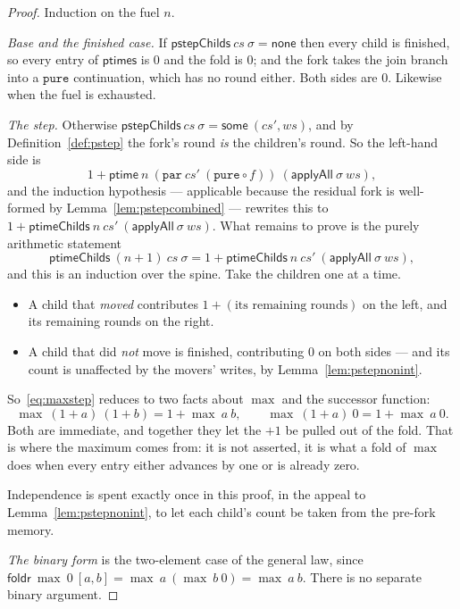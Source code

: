 \documentclass[11pt,a4paper]{article}
\theoremstyle{definition}
\theoremstyle{plain}
\theoremstyle{remark}
\newcommand{\st}{\sigma}
\newcommand{\pstep}{\mathsf{pstep}}
\begin{document}
\begin{proof}
Induction on the fuel $n$.

\emph{Base and the finished case.} If $\pstep\mathsf{Childs}\ cs\ \st = \mathsf{none}$ then
every child is finished, so every entry of $\mathsf{ptimes}$ is $0$ and the fold is $0$; and
the fork takes the join branch into a $\texttt{pure}$ continuation, which has no round either.
Both sides are $0$. Likewise when the fuel is exhausted.

\emph{The step.} Otherwise $\pstep\mathsf{Childs}\ cs\ \st = \mathsf{some}\ (cs', ws)$, and by
Definition~\ref{def:pstep} the fork's round \emph{is} the children's round. So the left-hand
side is
\[
  1 + \mathsf{ptime}\ n\ (\texttt{par}\ cs'\ (\texttt{pure}\circ f))\ (\mathsf{applyAll}\ \st\ ws) ,
\]
and the induction hypothesis --- applicable because the residual fork is well-formed by
Lemma~\ref{lem:pstepcombined} --- rewrites this to
$1 + \mathsf{ptimeChilds}\ n\ cs'\ (\mathsf{applyAll}\ \st\ ws)$. What remains to prove is the
purely arithmetic statement
\begin{equation}
  \mathsf{ptimeChilds}\ (n{+}1)\ cs\ \st
  = 1 + \mathsf{ptimeChilds}\ n\ cs'\ (\mathsf{applyAll}\ \st\ ws), \label{eq:maxstep}
\end{equation}
and this is an induction over the spine. Take the children one at a time.
\begin{itemize}[leftmargin=1.6em,itemsep=1pt]
\item A child that \emph{moved} contributes $1 + (\text{its remaining rounds})$ on the left,
      and its remaining rounds on the right.
\item A child that did \emph{not} move is finished, contributing $0$ on both sides --- and its
      count is unaffected by the movers' writes, by Lemma~\ref{lem:pstepnonint}.
\end{itemize}
So~\eqref{eq:maxstep} reduces to two facts about $\max$ and the successor function:
\[
  \max\ (1+a)\ (1+b) = 1 + \max\ a\ b, \qquad \max\ (1+a)\ 0 = 1 + \max\ a\ 0 .
\]
Both are immediate, and together they let the $+1$ be pulled out of the fold. That is where
the maximum comes from: it is not asserted, it is what a fold of $\max$ does when every entry
either advances by one or is already zero.

Independence is spent exactly once in this proof, in the appeal to
Lemma~\ref{lem:pstepnonint}, to let each child's count be taken from the pre-fork memory.

\emph{The binary form} is the two-element case of the general law, since
$\mathsf{foldr}\ \max\ 0\ [a,b] = \max\ a\ (\max\ b\ 0) = \max\ a\ b$. There is no separate
binary argument.
\end{proof}
\end{document}
